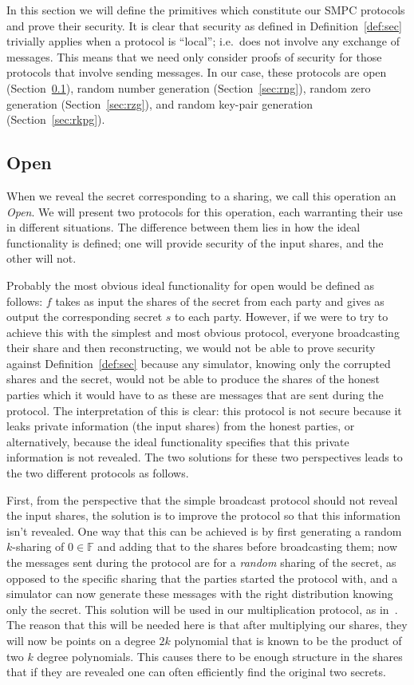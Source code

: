 \documentclass{article}
\theoremstyle{remark}
\newcommand{\F}{\mathbb{F}}
\begin{document}
In this section we will define the primitives which constitute our SMPC
protocols and prove their security. It is clear that security as defined in
Definition~\ref{def:sec} trivially applies when a protocol is ``local''; i.e.\
does not involve any exchange of messages. This means that we need only
consider proofs of security for those protocols that involve sending messages.
In our case, these protocols are open (Section~\ref{sec:open}), random number
generation (Section~\ref{sec:rng}), random zero generation
(Section~\ref{sec:rzg}), and random key-pair generation
(Section~\ref{sec:rkpg}).

\subsection{Open}\label{sec:open}

When we reveal the secret corresponding to a sharing, we call this operation an
\textit{Open}. We will present two protocols for this operation, each
warranting their use in different situations. The difference between them lies
in how the ideal functionality is defined; one will provide security of the
input shares, and the other will not.

Probably the most obvious ideal functionality for open would be defined as
follows: $f$ takes as input the shares of the secret from each party and gives
as output the corresponding secret $s$ to each party. However, if we were to
try to achieve this with the simplest and most obvious protocol, everyone
broadcasting their share and then reconstructing, we would not be able to prove
security against Definition~\ref{def:sec} because any simulator, knowing only
the corrupted shares and the secret, would not be able to produce the shares of
the honest parties which it would have to as these are messages that are sent
during the protocol.  The interpretation of this is clear: this protocol is not
secure because it leaks private information (the input shares) from the honest
parties, or alternatively, because the ideal functionality specifies that this
private information is not revealed. The two solutions for these two
perspectives leads to the two different protocols as follows.

First, from the perspective that the simple broadcast protocol should not
reveal the input shares, the solution is to improve the protocol so that this
information isn't revealed. One way that this can be achieved is by first
generating a random $k$-sharing of $0 \in \F$ and adding that to the shares
before broadcasting them; now the messages sent during the protocol are for a
\textit{random} sharing of the secret, as opposed to the specific sharing that
the parties started the protocol with, and a simulator can now generate these
messages with the right distribution knowing only the secret. This solution
will be used in our multiplication protocol, as in~\cite{gjkr96}. The reason
that this will be needed here is that after multiplying our shares, they will
now be points on a degree $2k$ polynomial that is known to be the product of
two $k$ degree polynomials. This causes there to be enough structure in the
shares that if they are revealed one can often efficiently find the original
two secrets.
\end{document}
